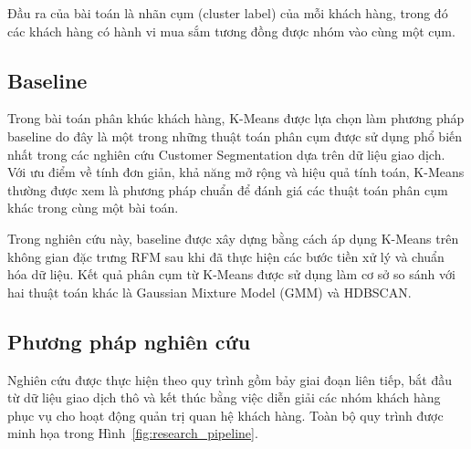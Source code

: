 \documentclass[12pt]{ai_conquer2026}
\begin{document}
Đầu ra của bài toán là nhãn cụm (cluster label) của mỗi khách hàng, trong đó các khách hàng có hành vi mua sắm tương đồng được nhóm vào cùng một cụm. 

\subsection{Baseline}

Trong bài toán phân khúc khách hàng, K-Means được lựa chọn làm phương pháp baseline do đây là một trong những thuật toán phân cụm được sử dụng phổ biến nhất trong các nghiên cứu Customer Segmentation dựa trên dữ liệu giao dịch. Với ưu điểm về tính đơn giản, khả năng mở rộng và hiệu quả tính toán, K-Means thường được xem là phương pháp chuẩn để đánh giá các thuật toán phân cụm khác trong cùng một bài toán.

Trong nghiên cứu này, baseline được xây dựng bằng cách áp dụng K-Means trên không gian đặc trưng RFM sau khi đã thực hiện các bước tiền xử lý và chuẩn hóa dữ liệu. Kết quả phân cụm từ K-Means được sử dụng làm cơ sở so sánh với hai thuật toán khác là Gaussian Mixture Model (GMM) và HDBSCAN.

\subsection{Phương pháp nghiên cứu}

Nghiên cứu được thực hiện theo quy trình gồm bảy giai đoạn liên tiếp, bắt đầu từ dữ liệu giao dịch thô và kết thúc bằng việc diễn giải các nhóm khách hàng phục vụ cho hoạt động quản trị quan hệ khách hàng. Toàn bộ quy trình được minh họa trong Hình~\ref{fig:research_pipeline}.
\end{document}
